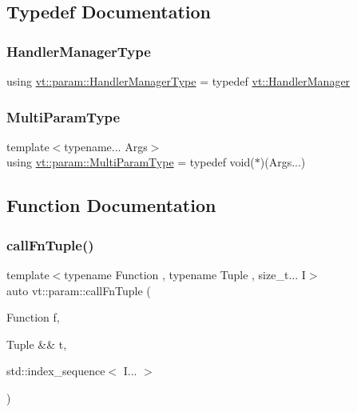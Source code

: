 \subsection{Typedef Documentation}
\mbox{\label{namespacevt_1_1param_ad9561687e11201a35ed8aba0b666c0b4}} 
\subsubsection{\texorpdfstring{Handler\+Manager\+Type}{HandlerManagerType}}
{\footnotesize\ttfamily using \hyperlink{namespacevt_1_1param_ad9561687e11201a35ed8aba0b666c0b4}{vt\+::param\+::\+Handler\+Manager\+Type} = typedef \hyperlink{structvt_1_1_handler_manager}{vt\+::\+Handler\+Manager}}

\mbox{\label{namespacevt_1_1param_ada9e92f75ab7e859947a8ffe5bae6c5b}} 
\subsubsection{\texorpdfstring{Multi\+Param\+Type}{MultiParamType}}
{\footnotesize\ttfamily template$<$typename... Args$>$ \\
using \hyperlink{namespacevt_1_1param_ada9e92f75ab7e859947a8ffe5bae6c5b}{vt\+::param\+::\+Multi\+Param\+Type} = typedef void($\ast$)(Args...)}



\subsection{Function Documentation}
\mbox{\label{namespacevt_1_1param_a776cb4d76cdd0199f02e22708d9e893c}} 
\subsubsection{\texorpdfstring{call\+Fn\+Tuple()}{callFnTuple()}}
{\footnotesize\ttfamily template$<$typename Function , typename Tuple , size\+\_\+t... I$>$ \\
auto vt\+::param\+::call\+Fn\+Tuple (\begin{DoxyParamCaption}\item[{Function}]{f,  }\item[{Tuple \&\&}]{t,  }\item[{std\+::index\+\_\+sequence$<$ I... $>$}]{ }\end{DoxyParamCaption})}

